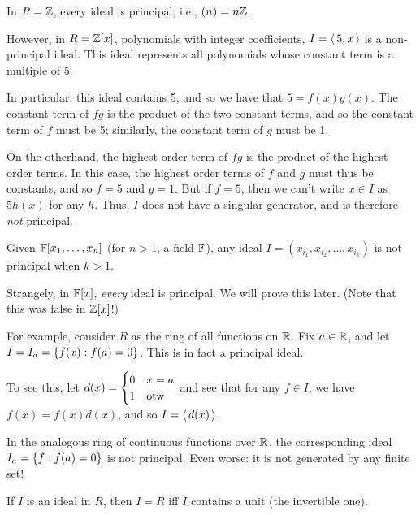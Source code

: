 \begin{xmp}[source=Primary Source Material]
    In $ R = \mathbb{Z} $, every ideal is principal; i.e., $ (n) = n\mathbb{Z} $. \npgh

    However, in $ R = \mathbb{Z}[x] $, polynomials with integer coefficients,
    $ I = \operatorname{\langle} 5, x \operatorname{\rangle} $ is a non-principal ideal. This ideal represents all polynomials whose
    constant term is a multiple of 5. \npgh

    In particular, this ideal contains 5, and so we have that $ 5 = f(x)g(x) $.
    The constant term of $ fg $ is the product of the two constant terms, and so the constant
    term of $ f $ must be 5; similarly, the constant term of $ g $ must be 1. \npgh

    On the otherhand, the highest order term of $ fg $ is the product of the highest order terms.
    In this case, the highest order terms of $ f $ and $ g $ must thus be constants, and so
    $ f = 5 $ and $ g = 1 $. \vsp
    But if $ f = 5 $, then we can't write $ x \in I $ as $ 5h(x) $ for any $ h $.
    Thus, $ I $ does not have a singular generator, and is therefore \textit{not} principal.
\end{xmp}

Given $ \mathbb{F}[x_{1}, \dots, x_{n}] $ (for $ n > 1 $, a field $ \mathbb{F} $),
any ideal $ I = (x_{i_{1}}, x_{i_{2}}, \dots, x_{i_{k}}) $ is not principal when $ k > 1 $.

Strangely, in $ \mathbb{F}[x] $, \textit{every} ideal is principal. We will prove this later.
(Note that this was false in $ \mathbb{Z}[x] $!)

For example, consider $ R $ as the ring of all functions on $ \mathbb{R} $.
Fix $ a \in \mathbb{R} $, and let $ I = I_{a} = \left\{{f(x) : f(a) = 0}\right\} $. This is in fact a
principal ideal.

To see this, let $ d(x) = \begin{cases} 0 & x = a \\ 1 & \textrm{otw} \end{cases} $
and see that for any $ f \in I $, we have $ f(x) = f(x)d(x) $, and so $ I = \operatorname{\langle} d(x) \operatorname{\rangle} $.

In the analogous ring of continuous functions over $ \mathbb{R} $, the corresponding ideal
$ I_{a} = \left\{{f : f(a) = 0}\right\} $ is not principal. Even worse: it is not generated by any finite set!

\begin{thm}
    If $ I $ is an ideal in $ R $, then $ I = R $ iff $ I $ contains a unit (the invertible one).
\end{thm}

